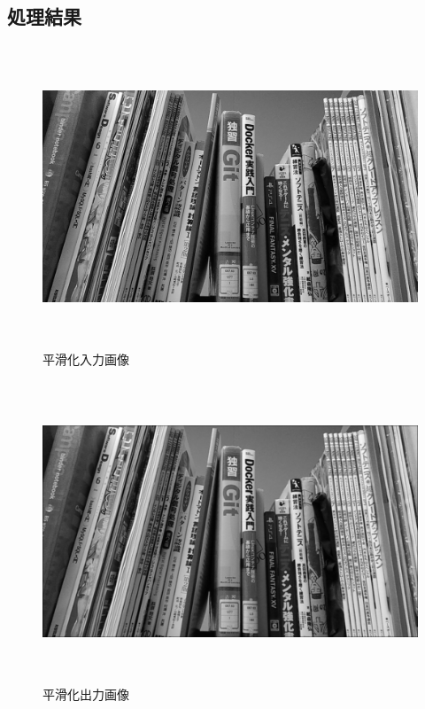 \documentclass[11pt,a4j]{jsarticle}
\begin{document}
    \subsection{処理結果}
    \begin{figure}[H]
      \centering
      \includegraphics[clip,width=16.0cm ,height= 9.0cm]{./img/smoothed/smoothed_source.png}
      \caption{平滑化入力画像\label{fig:smoothed_source}}
    \end{figure}
    \begin{figure}[H]
      \centering
      \includegraphics[clip,width=16.0cm ,height= 9.0cm]{./img/smoothed/smoothed.png}
      \caption{平滑化出力画像\label{fig:smoothed_result}}
    \end{figure}
\end{document}
